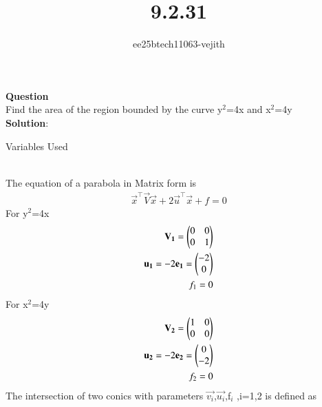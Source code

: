 \documentclass[journal]{IEEEtran}
\begin{document}

\vspace{3cm}

\title{9.2.31}
\author{ee25btech11063-vejith}

\maketitle
{\let\newpage\relax\maketitle}
\renewcommand{\thefigure}{\theenumi}
\renewcommand{\thetable}{\theenumi}
\setlength{\intextsep}{10pt} %
\textbf{Question}\\
Find the area of the region bounded by the curve y$^2$=4x and x$^2$=4y\\
\textbf{Solution}:\\
\begin{table}[h!]    
  \centering
  
  \caption{Variables Used}
  \label{}
\end{table}\\
The equation of a parabola in Matrix form is
\begin{align}
\vec{x}^\top\vec{V}\vec{x} + 2\vec{u}^\top\vec{x} + f = 0
\end{align}
For y$^2$=4x
\begin{align}
    \mathbf{V_1}=\begin{pmatrix}
        0 & 0\\
        0 & 1
    \end{pmatrix}\\
    \mathbf{u_1}=-2\mathbf{e_1}=\begin{pmatrix}-2\\0\end{pmatrix}\\
    f_1=0
\end{align}
For x$^2$=4y
\begin{align}
    \mathbf{V_2}=\begin{pmatrix}
        1 & 0\\
        0 & 0
    \end{pmatrix}\\
    \mathbf{u_2}=-2\mathbf{e_2}=\begin{pmatrix}0\\-2\end{pmatrix}\\
    f_2=0
\end{align}
The intersection of two conics with parameters $\vec{v_i}$,$\vec{u_i}$,f$_i$ ,i=1,2 is defined as 
\end{document}
